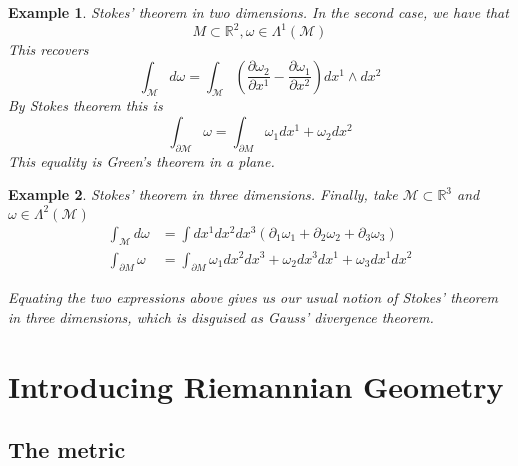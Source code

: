 \documentclass[11pt, a4paper]{article}   	%
\theoremstyle{slplain}
\newtheorem*{example}{Example}
\begin{document}
\begin{example}{Stokes' theorem in two dimensions. } 
In the second case, we have that 
\[
M \subset \mathbb{ R} ^ 2, \omega \in \Lambda^ 1 ( \mathcal{ M } ) 
\] This recovers 
\[
\int_{ \mathcal{ M } } d \omega = \int_{ \mathcal{ M } } \left( \frac{\partial \omega_2 }{\partial  x^ 1 }  - \frac{\partial  \omega_1 }{\partial  x^ 2}  \right) dx^ 1 \wedge  dx^2  
\] By Stokes theorem this is 
\[
\int_{ \partial  \mathcal{ M  } } \omega = \int_{ \partial  M } \omega_1 dx^ 1 + \omega_2 dx^ 2  
\] This equality is Green's theorem in a plane. 

\end{example}

\begin{example}{Stokes' theorem in three dimensions.} 
Finally, take $ \mathcal{ M } \subset \mathbb{ R}^ 3 $ and $ \omega \in \Lambda^ 2 ( \mathcal{ M } ) $
\begin{align*}
\int_{ \mathcal{ M } } d \omega & = \int dx^ 1 dx^ 2 dx^ 3 ( \partial_1 \omega_1 + \partial_2 \omega_2 + \partial  _ 3 \omega _ 3 ) \\
\int_{ \partial  M   } \omega  &= \int_{ \partial  M  } \omega_1 dx^ 2 dx^ 3 + \omega_ 2 dx^ 3 dx^ 1 + \omega_3 dx^ 1 dx^ 2 
\end{align*}

Equating the two expressions above 
gives us our usual notion of Stokes' theorem in three dimensions, which 
is disguised as Gauss' divergence theorem. 
\end{example}

\pagebreak 
\section{Introducing Riemannian Geometry} 
\subsection{ The metric}
\end{document}
